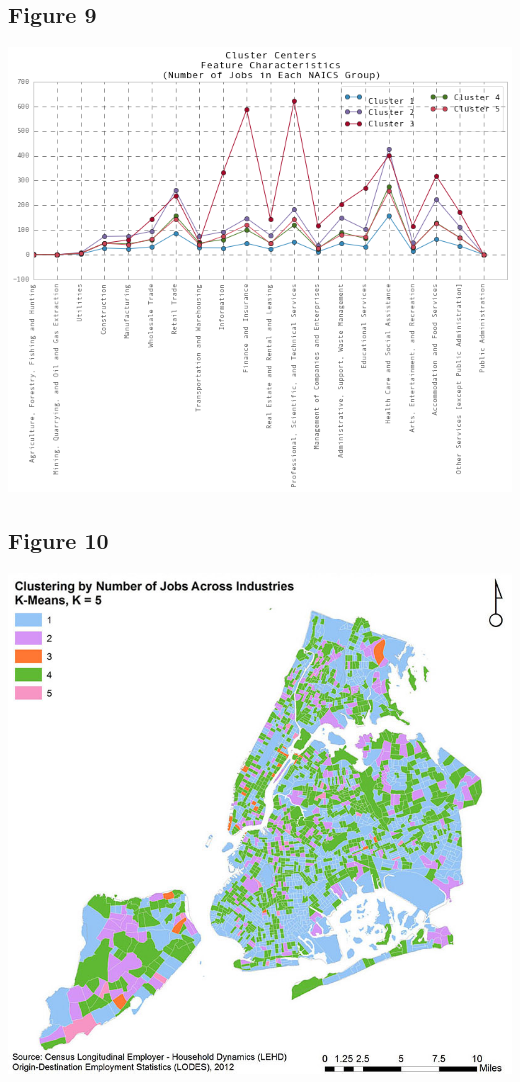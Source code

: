 \documentclass[article, 11pt]{article} %
\begin{document}
\subsection*{Figure 9}
\includegraphics[width=1.0\textwidth]{9}
\subsection*{Figure 10}
\includegraphics[width=1.0\textwidth]{10}
\end{document}
